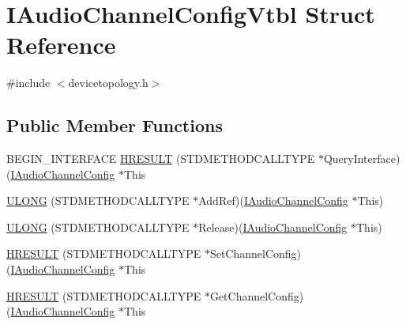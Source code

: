 \hypertarget{struct_i_audio_channel_config_vtbl}{}\section{I\+Audio\+Channel\+Config\+Vtbl Struct Reference}
\label{struct_i_audio_channel_config_vtbl}


{\ttfamily \#include $<$devicetopology.\+h$>$}

\subsection*{Public Member Functions}
\begin{DoxyCompactItemize}
\item 
B\+E\+G\+I\+N\+\_\+\+I\+N\+T\+E\+R\+F\+A\+CE \hyperlink{struct_i_audio_channel_config_vtbl_a30e8345b8c4e4d687b4c367344fa5f88}{H\+R\+E\+S\+U\+LT} (S\+T\+D\+M\+E\+T\+H\+O\+D\+C\+A\+L\+L\+T\+Y\+PE $\ast$Query\+Interface)(\hyperlink{devicetopology_8h_ab703cd8ba99c9cdcee33b19dfdc917dc}{I\+Audio\+Channel\+Config} $\ast$This
\item 
\hyperlink{struct_i_audio_channel_config_vtbl_a47d1d3ae217660ba01052bd0ec272191}{U\+L\+O\+NG} (S\+T\+D\+M\+E\+T\+H\+O\+D\+C\+A\+L\+L\+T\+Y\+PE $\ast$Add\+Ref)(\hyperlink{devicetopology_8h_ab703cd8ba99c9cdcee33b19dfdc917dc}{I\+Audio\+Channel\+Config} $\ast$This)
\item 
\hyperlink{struct_i_audio_channel_config_vtbl_a9f6bb66764170d20b5a88f73fa62111a}{U\+L\+O\+NG} (S\+T\+D\+M\+E\+T\+H\+O\+D\+C\+A\+L\+L\+T\+Y\+PE $\ast$Release)(\hyperlink{devicetopology_8h_ab703cd8ba99c9cdcee33b19dfdc917dc}{I\+Audio\+Channel\+Config} $\ast$This)
\item 
\hyperlink{struct_i_audio_channel_config_vtbl_a4b91789ae80ef66ebdd3dae4b42d2028}{H\+R\+E\+S\+U\+LT} (S\+T\+D\+M\+E\+T\+H\+O\+D\+C\+A\+L\+L\+T\+Y\+PE $\ast$Set\+Channel\+Config)(\hyperlink{devicetopology_8h_ab703cd8ba99c9cdcee33b19dfdc917dc}{I\+Audio\+Channel\+Config} $\ast$This
\item 
\hyperlink{struct_i_audio_channel_config_vtbl_a3cf0bf99569f9fe2d37d6e07f5a56f15}{H\+R\+E\+S\+U\+LT} (S\+T\+D\+M\+E\+T\+H\+O\+D\+C\+A\+L\+L\+T\+Y\+PE $\ast$Get\+Channel\+Config)(\hyperlink{devicetopology_8h_ab703cd8ba99c9cdcee33b19dfdc917dc}{I\+Audio\+Channel\+Config} $\ast$This
\end{DoxyCompactItemize}
